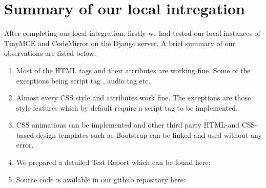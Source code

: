 \section{Summary of our local intregation}
After completing our local integration, firstly we had tested our local instances of
TinyMCE and CodeMirror on the Django server. A brief summary of our observations are
listed below.
\begin{enumerate}
\item Most of the HTML tags and their atrributes are working fine. Some of the exceptions
being script tag , audio tag etc.
\item Almost every CSS style and attributes work fine. The exceptions are those style features
which by default require a script tag to be implemented.
\item CSS animations can be implemented and other third party HTML-and CSS-based design
templates such as Bootstrap can be linked and used without any error.
\item We prepared a detailed Test Report which can be found here:\newline[\url{https://docs.google.com/spreadsheets/d/1AJQWfAG2NIjpxFZt2fnLPlKdhP2-q35KZ0DOmdb-F0w/edit#gid=0}]
\item  Source code is available in our github repository here:
\end{enumerate}


